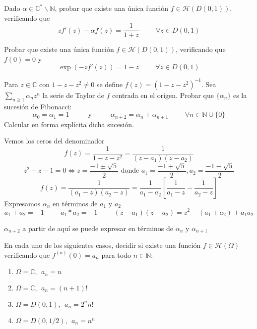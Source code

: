 \begin{ejer}
	Dado $\alpha\in\mathbb{C}^{\ast}\backslash\mathbb{N}$, probar que existe una única función $f\in\mathcal{H}(D(0,1))$, verificando que
	$$ zf'(z)-\alpha f(z) = \frac{1}{1+z} \hspace{1cm} \forall z\in D(0,1) $$
\end{ejer}

\begin{ejer}
	Probar que existe una única función $f\in\mathcal{H}(D(0,1))$, verificando que $f(0)=0$ y 
	$$ \exp(-zf'(z)) = 1-z \hspace{1cm} \forall z\in D(0,1) $$
\end{ejer}



\begin{ejer}
	Para $z\in\mathbb{C}$ con $1-z-z^2\not =0$ se define $f(z) = (1-z-z^2)^{-1}$. Sea $\sum_{n\geq 1}\alpha_nz^n$ la serie de Taylor de $f$ centrada en el origen. Probar que $\{\alpha_n \}$ es la sucesión de Fibonacci:
	$$ \alpha_0 = \alpha_{1} = 1 \hspace{1cm}\text{ y }\hspace{1cm} \alpha_{n+2} = \alpha_n + \alpha_{n+1} \hspace{1cm}\forall n\in\mathbb{N}\cup\{0\}  $$
	Calcular en forma explícita dicha sucesión.
\end{ejer}
\begin{sol}
Vemos los ceros del denominador
$$f(z) = \frac{1}{1-z-z^2} = \frac{1}{(z-a_1)(z-a_2)} $$
$$z^2+z-1 = 0 \Longleftrightarrow z = \frac{-1\pm \sqrt{5}}{2} \text{\ \ donde \ \ } a_1=\frac{-1+ \sqrt{5}}{2},a_2=\frac{-1- \sqrt{5}}{2}$$
$$f(z) = \frac{1}{(a_1-z)(a_2-z)} = \frac{1}{a_1-a_2}\left[ \frac{1}{a_1-z}-\frac{1}{a_2-z} \right]$$
Expresamos $\alpha_n$ en términos de $a_1$ y $a_2$
$$a_1+a_2 = -1 \hspace{1cm}a_1*a_2=-1 \hspace{1cm}(z-a_1)(z-a_2) = z^2-(a_1+a_2) + a_1a_2$$

$\alpha_{n+2}$ a partir de aquí se puede expresar en términos de $\alpha_n$ y $\alpha_{n+1}$
\end{sol}


\begin{ejer}
	En cada uno de los siguientes casos, decidir si existe una función $f\in\mathcal{H}(\Omega)$ verificando que $f^{(n)}(0)=a_n$ para todo $n\in\mathbb{N}$:
	\begin{enumerate}[label=(\alph*)]
		\item $\Omega = \mathbb{C}, \ \ a_n=n$
		\item $\Omega=\mathbb{C},\ \ a_n=(n+1)!$
		\item $\Omega=D(0,1), \ \ a_n=2^nn!$
		\item $\Omega=D(0,1/2), \ \ a_n=n^n$
	\end{enumerate}
\end{ejer}

